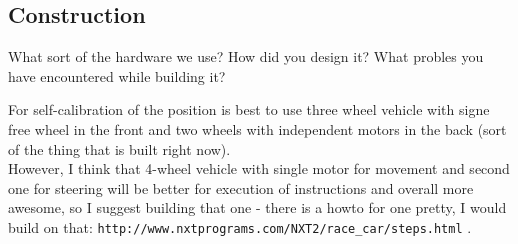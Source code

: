 \subsection{Construction}
What sort of the hardware we use? How did you design it? What probles you have encountered while building it?

For self-calibration of the position is best to use three wheel vehicle with signe free wheel in the front and two wheels with independent motors in the back (sort of the thing that is built right now). \\
However, I think that 4-wheel vehicle with single motor for movement and second one for steering will be better for execution of instructions and overall more awesome, so I suggest building that one - there is a howto for one pretty, I would build on that: \verb+http://www.nxtprograms.com/NXT2/race_car/steps.html+ .